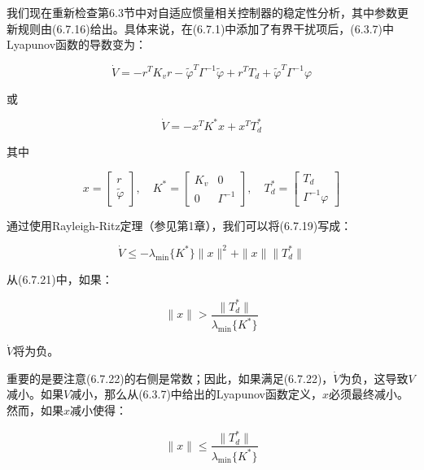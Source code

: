 \documentclass[12pt,a4paper]{ctexart}
\begin{document}
我们现在重新检查第6.3节中对自适应惯量相关控制器的稳定性分析，其中参数更新规则由(6.7.16)给出。具体来说，在(6.7.1)中添加了有界干扰项后，(6.3.7)中Lyapunov函数的导数变为：

\begin{equation}\label{eq:6.7.18}
\dot{V} = -r^T K_v r - \tilde{\varphi}^T \Gamma^{-1} \tilde{\varphi} + r^T T_d + \tilde{\varphi}^T \Gamma^{-1} \varphi
\end{equation}

或

\begin{equation}\label{eq:6.7.19}
\dot{V} = -x^T K^{*} x + x^T T_d^{*}
\end{equation}

其中

\begin{equation}\label{eq:6.7.20}
x = \begin{bmatrix} r \\ \tilde{\varphi} \end{bmatrix}, \quad K^{*} = \begin{bmatrix} K_v & 0 \\ 0 & \Gamma^{-1} \end{bmatrix}, \quad T_d^{*} = \begin{bmatrix} T_d \\ \Gamma^{-1} \varphi \end{bmatrix}
\end{equation}

通过使用Rayleigh-Ritz定理（参见第1章），我们可以将(6.7.19)写成：

\begin{equation}\label{eq:6.7.21}
\dot{V} \leq -\lambda_{\min}\{K^{*}\}\|x\|^2 + \|x\|\|T_d^{*}\|
\end{equation}

从(6.7.21)中，如果：

\begin{equation}\label{eq:6.7.22}
\|x\| > \frac{\|T_d^{*}\|}{\lambda_{\min}\{K^{*}\}}
\end{equation}

$\dot{V}$将为负。

重要的是要注意(6.7.22)的右侧是常数；因此，如果满足(6.7.22)，$\dot{V}$为负，这导致$V$减小。如果$V$减小，那么从(6.3.7)中给出的Lyapunov函数定义，$x$必须最终减小。然而，如果$x$减小使得：

\begin{equation}\label{eq:6.7.23}
\|x\| \leq \frac{\|T_d^{*}\|}{\lambda_{\min}\{K^{*}\}}
\end{equation}
\end{document}
